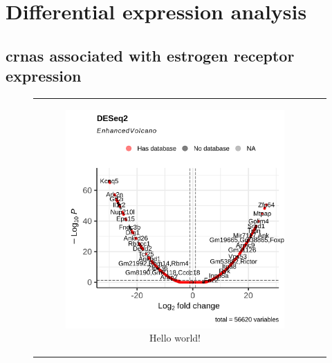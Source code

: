 \section{Differential expression analysis}

\subsection{\Glspl{crna} associated with estrogen receptor expression}

\begin{figure}[H] \begin{tabular}{cc}
        \begin{subfigure}{0.5\textwidth} \centering

            \includegraphics[width=\linewidth]{chapters/4_results_and_discussion/figures/dea/deseq2/esr1/volcano.png}
            \caption{Hello world!
            }
            \label{fig:esr1_volcano}
        \end{subfigure}
        \begin{subfigure}{0.5\textwidth}
            \centering


\end{subfigure}
\end{tabular}
\end{figure}
